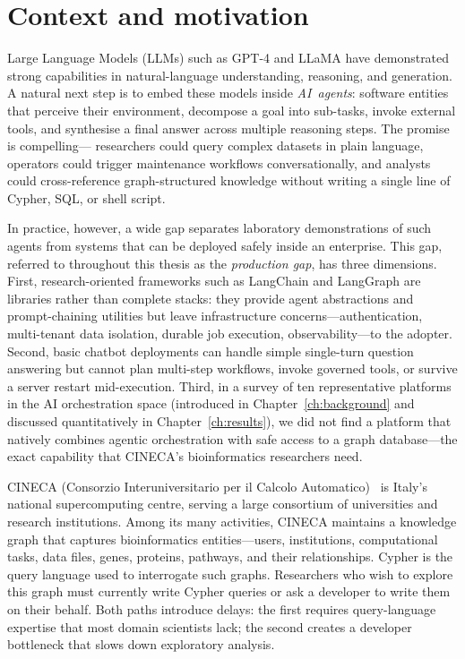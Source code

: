 \documentclass[a4paper]{sapthesis}
\begin{document}
\section{Context and motivation}
\label{sec:context-motivation}

Large Language Models (LLMs) such as GPT-4 and LLaMA have demonstrated
strong capabilities in natural-language understanding, reasoning, and
generation.  A natural next step is to embed these models inside
\emph{AI~agents}: software entities that perceive their environment,
decompose a goal into sub-tasks, invoke external tools, and synthesise a
final answer across multiple reasoning steps.  The promise is compelling---
researchers could query complex datasets in plain language, operators could
trigger maintenance workflows conversationally, and analysts could
cross-reference graph-structured knowledge without writing a single line of
Cypher, SQL, or shell script.

In practice, however, a wide gap separates laboratory demonstrations of such
agents from systems that can be deployed safely inside an enterprise.  This gap,
referred to throughout this thesis as the \emph{production gap}, has three
dimensions.  First, research-oriented frameworks such as LangChain and
LangGraph are libraries rather than complete stacks: they provide agent
abstractions and prompt-chaining utilities but leave infrastructure
concerns---authentication, multi-tenant data isolation, durable job
execution, observability---to the adopter.  Second, basic chatbot
deployments can handle simple single-turn question answering but cannot plan
multi-step workflows, invoke governed tools, or survive a server restart
mid-execution.  Third, in a survey of ten representative platforms in the AI
orchestration space (introduced in Chapter~\ref{ch:background} and
discussed quantitatively in Chapter~\ref{ch:results}), we did not
find a platform that natively combines agentic orchestration with safe
access to a graph database---the exact capability that CINECA's
bioinformatics researchers need.

CINECA (Consorzio Interuniversitario per il Calcolo
Automatico)~\cite{cineca2023} is Italy's national supercomputing centre,
serving a large consortium of universities and research institutions.  Among its many activities, CINECA maintains a knowledge graph
that captures bioinformatics entities---users, institutions, computational
tasks, data files, genes, proteins, pathways, and their relationships.
Cypher is the query language used to interrogate such graphs.  Researchers
who wish to explore this graph must currently write Cypher queries or ask a
developer to write them on their behalf.  Both paths introduce delays: the first requires query-language
expertise that most domain scientists lack; the second creates a developer
bottleneck that slows down exploratory analysis.
\end{document}
